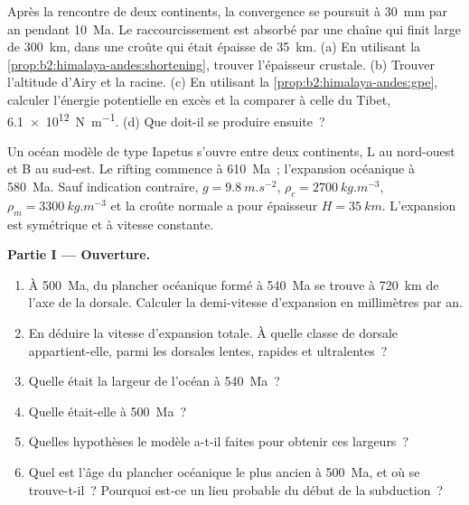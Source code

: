 \begin{exercise}[$\star\star\star$]\label{exo:b2:wilson-cycle:12}
Après la rencontre de deux continents, la convergence se poursuit à \qty{30}{mm} par an pendant \qty{10}{Ma}. Le
raccourcissement est absorbé par une chaîne qui finit large de \qty{300}{km}, dans une croûte qui était
épaisse de \qty{35}{km}. (a) En utilisant la \cref{prop:b2:himalaya-andes:shortening}, trouver l'épaisseur
crustale. (b) Trouver l'altitude d'Airy et la racine. (c) En utilisant la \cref{prop:b2:himalaya-andes:gpe},
calculer l'énergie potentielle en excès et la comparer à celle du Tibet, \qty{6.1e12}{N.m^{-1}}.
(d) Que doit-il se produire ensuite~?
\end{exercise}

\begin{problem}\label{pb:b2:wilson-cycle:1}
Un océan modèle de type Iapetus s'ouvre entre deux continents, L au nord-ouest et B au
sud-est. Le rifting commence à \qty{610}{Ma}~; l'expansion océanique à \qty{580}{Ma}.
Sauf indication contraire, $g = \qty{9.8}{m.s^{-2}}$, $\rho_c = \qty{2700}{kg.m^{-3}}$, $\rho_m =
\qty{3300}{kg.m^{-3}}$ et la croûte normale a pour épaisseur $H = \qty{35}{km}$. L'expansion est
symétrique et à vitesse constante.

\medskip
\noindent\textbf{Partie I --- Ouverture.}
\begin{enumerate}
\item À \qty{500}{Ma}, du plancher océanique formé à \qty{540}{Ma} se trouve à \qty{720}{km} de l'axe de la
dorsale. Calculer la demi-vitesse d'expansion en millimètres par an.
\item En déduire la vitesse d'expansion totale. À quelle classe de dorsale appartient-elle, parmi les dorsales lentes,
rapides et ultralentes~?
\item Quelle était la largeur de l'océan à \qty{540}{Ma}~?
\item Quelle était-elle à \qty{500}{Ma}~?
\item Quelles hypothèses le modèle a-t-il faites pour obtenir ces largeurs~?
\item Quel est l'âge du plancher océanique le plus ancien à \qty{500}{Ma}, et où se trouve-t-il~? Pourquoi est-ce un
lieu probable du début de la subduction~?
\end{enumerate}


\end{problem}
